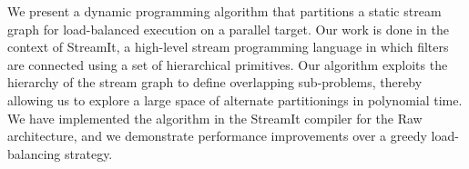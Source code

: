 We present a dynamic programming algorithm that partitions a static
stream graph for load-balanced execution on a parallel target.  Our
work is done in the context of StreamIt, a high-level stream
programming language in which filters are connected using a set of
hierarchical primitives.  Our algorithm exploits the hierarchy of the
stream graph to define overlapping sub-problems, thereby allowing us
to explore a large space of alternate partitionings in polynomial
time.  We have implemented the algorithm in the StreamIt compiler for
the Raw architecture, and we demonstrate performance improvements over
a greedy load-balancing strategy.
